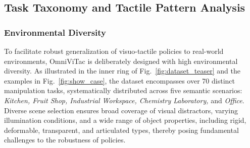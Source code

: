 \subsection{Task Taxonomy and Tactile Pattern Analysis}
\label{sec:task}
\subsubsection{Environmental Diversity}

To facilitate robust generalization of visuo-tactile policies to real-world environments, OmniViTac is deliberately designed with high environmental diversity. As illustrated in the inner ring of Fig.~\ref{fig:dataset_teaser} and the examples in Fig.~\ref{fig:show_case}, the dataset encompasses over 70 distinct manipulation tasks, systematically distributed across five semantic scenarios: \textit{Kitchen, Fruit Shop, Industrial Workspace, Chemistry Laboratory,} and \textit{Office}. Diverse scene selection ensures broad coverage of visual distractors, varying illumination conditions, and a wide range of object properties, including rigid, deformable, transparent, and articulated types, thereby posing fundamental challenges to the robustness of policies.


